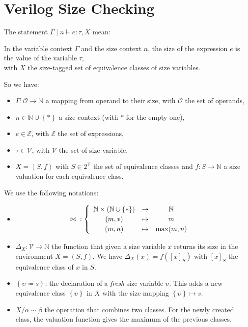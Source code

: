 \documentclass{article}
\begin{document}
\section*{Verilog Size Checking}

The statement $\Gamma \mid n \vdash e: \tau, X$ mean:
\begin{center}
    In the variable context $\Gamma$ and the size context $n$, the size of the expression $e$ is the value of the variable $\tau$,\\
    with $X$ the size-tagged set of equivalence classes of size variables.
\end{center}

So we have:
\begin{itemize}
    \item $\Gamma: \mathcal{O} \to \mathbb{N}$ a mapping from operand to their size, with $\mathcal{O}$ the set of operands,
    \item $n \in \mathbb{N} \cup \left\{\ast\right\}$ a size context (with $\ast$ for the empty one),
    \item $e \in \mathcal{E}$, with $\mathcal{E}$ the set of expressions,
    \item $\tau \in \mathcal{V}$, with $\mathcal{V}$ the set of size variable,
    \item $X = (S, f)$ with $S \in 2^{\mathcal{V}}$ the set of equivalence classes and $f: S \to \mathbb{N}$ a size valuation for each equivalence class.
\end{itemize}


We use the following notations:
\begin{itemize}
    \item \begin{align*}
              {}\bowtie{} & :
              \left\{
              \def\arraystretch{1.2}
              \begin{array}{ccc}
                  \mathbb{N} \times \left(\mathbb{N} \cup \left\{\ast\right\}\right) & \to     & \mathbb{N} \\
                  (m, \ast)                                                          & \mapsto & m          \\
                  (m, n)                                                             & \mapsto & \max(m, n) \\
              \end{array}
              \right.
          \end{align*}
    \item $\Delta_X : \mathcal{V} \to \mathbb{N}$ the function that given a size variable $x$ returns its size in the environment $X=(S, f)$. We have $\Delta_X(x) = f\left({[x]}_S\right)$ with ${[x]}_S$ the equivalence class of $x$ in $S$.
    \item $\left\{\upsilon \coloneq s\right\}$: the declaration of a \emph{fresh} size variable $\upsilon$. This adds a new equivalence class $\left\{\upsilon\right\}$ in $X$ with the size mapping $\left\{\upsilon\right\} \mapsto s$.
    \item $X/\alpha \sim \beta$ the operation that combines two classes. For the newly created class, the valuation function gives the maximum of the previous classes.
\end{itemize}
\end{document}
